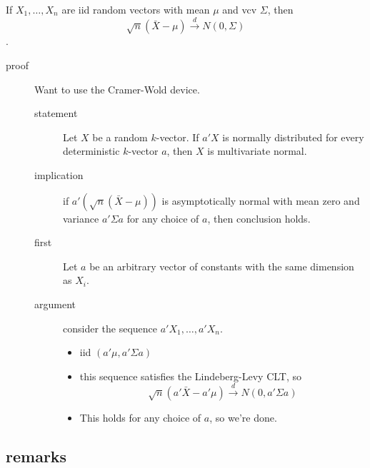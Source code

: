      If $X_1,\dots,X_n$ are iid random vectors with mean $\mu$ and vcv
     $\Sigma$, then $$\sqrt{n}(\bar X - \mu) \xrightarrow{d}
     N(0,\Sigma)$$.
\begin{description}
\item[proof] Want to use the Cramer-Wold device.
\begin{description}
\item[statement] Let $X$ be a random $k$-vector.  If $a'X$
                  is normally distributed for every deterministic
                  $k$-vector $a$, then $X$ is multivariate normal.
\item[implication] if $a'(\sqrt{n}(\bar X - \mu))$ is
                  asymptotically normal with mean zero and variance
                  $a'\Sigma a$ for any choice of $a$, then conclusion
                  holds.
\item[first] Let $a$ be an arbitrary vector of constants
                           with the same dimension as $X_i$.
\item[argument] consider the sequence $a'X_1, \dots,
                              a'X_n$.
\begin{itemize}
\item iid $(a'\mu, a'\Sigma a)$
\item this sequence satisfies the Lindeberg-Levy CLT,
                    so $$\sqrt{n}(a'\bar X - a'\mu) \xrightarrow{d}
                    N(0,a'\Sigma a)$$
\item This holds for any choice of $a$, so we're done.
\end{itemize}
\end{description}
\end{description}

\subsection{remarks}

